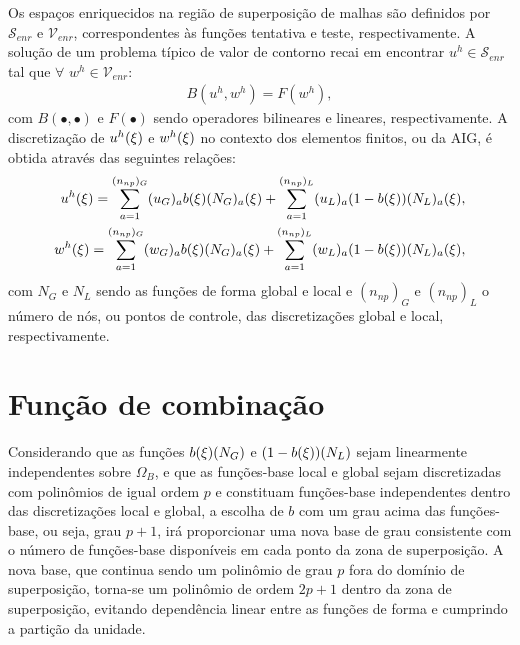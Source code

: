 Os espaços enriquecidos na região de superposição de malhas são definidos por $\mathcal{S}_{enr}$ e $\mathcal{V}_{enr}$, correspondentes às funções tentativa e teste, respectivamente. A solução de um problema típico de valor de contorno recai em encontrar $u^{h} \in \mathcal{S}_{enr}$ tal que $\forall$ $ w^{h} \in \mathcal{V}_{enr}$: 
\begin{align}
	B(u^{h},w^{h}) = F(w^{h}),
\end{align}
\noindent com $B(\bullet,\bullet)$ e $F(\bullet)$ sendo operadores bilineares e lineares, respectivamente. A discretização de $u^{h}(\xi)$ e $w^{h}(\xi)$ no contexto dos elementos finitos, ou da AIG, é obtida através das seguintes relações:
\begin{align}
	u^{h}(\xi) = \sum_{a = 1}^{(n_{np})_G} (u_{G})_{a}b(\xi)(N_{G})_{a}(\xi) + \sum_{a = 1}^{(n_{np})_L} (u_{L})_{a}(1-b(\xi))(N_{L})_{a}(\xi),\label{eq:u_mod} \\ 
	w^{h}(\xi) = \sum_{a = 1}^{(n_{np})_G} (w_{G})_{a}b(\xi)(N_{G})_{a}(\xi) + \sum_{a = 1}^{(n_{np})_L} (w_{L})_{a}(1-b(\xi))(N_{L})_{a}(\xi), \label{eq:w_mod}
\end{align}
\noindent com $N_{G}$ e $N_{L}$ sendo as funções de forma global e local e $(n_{np})_G$ e $(n_{np})_L$ o número de nós, ou pontos de controle, das discretizações global e local, respectivamente. 

\section{Função de combinação}

Considerando que as funções $b(\xi)(N_{G})$ e $(1-b(\xi))(N_{L})$ sejam linearmente independentes sobre $\Omega_{B}$, e que as funções-base local e global sejam discretizadas com polinômios de igual ordem $p$ e constituam funções-base independentes dentro das discretizações local e global, a escolha de $b$ com um grau acima das funções-base, ou seja, grau $p+1$, irá proporcionar uma nova base de grau consistente com o número de funções-base disponíveis em cada ponto da zona de superposição. A nova base, que continua sendo um polinômio de grau $p$ fora do domínio de superposição, torna-se um polinômio de ordem $2p+1$ dentro da zona de superposição, evitando dependência linear entre as funções de forma e cumprindo a partição da unidade.

